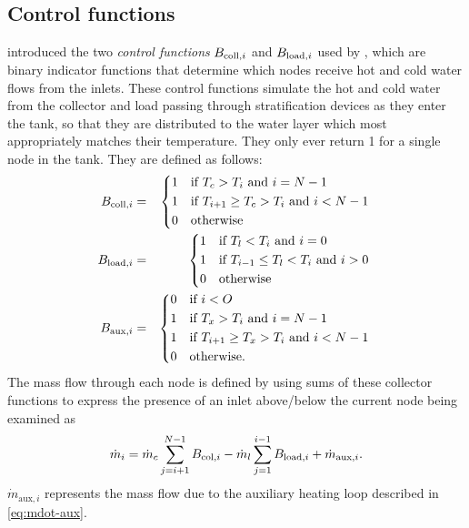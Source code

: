 \subsection{Control functions}

 introduced the two \emph{control functions} $B_{\text{coll}, i}$ and $B_{\text{load}, i}$ used by , which are binary indicator functions that determine which nodes receive hot and cold water flows from the inlets.
These control functions simulate the hot and cold water from the collector and load passing through stratification devices as they enter the tank, so that they are distributed to the water layer which most appropriately matches their temperature.
They only ever return 1 for a single node in the tank.
They are defined as follows:
\begin{eqnarray}
   \label{eq:B-coll}
   \B{coll} &=& \begin{dcases*}
      1 & if $T_c > T_i$ and $i = N-1$ \\
      1 & if $T_{i+1} \ge T_c > T_i$ and $i < N-1$ \\
      0 & otherwise
   \end{dcases*}
   \\
   \label{eq:B-load}
   \B{load} &=& \begin{dcases*}
      1 & if $T_l < T_i$ and $i = 0$ \\
      1 & if $T_{i-1} \le T_l < T_i$ and $i > 0$ \\
      0 & otherwise
   \end{dcases*}
   \\
   \label{eq:B-aux}
   \B{aux} &=& \begin{dcases*}
      0 & if $i < O$ \\
      1 & if $T_x > T_i$ and $i = N-1$ \\
      1 & if $T_{i+1} \ge T_x > T_i$ and $i < N-1$ \\
      0 & otherwise.
   \end{dcases*}
\end{eqnarray}
The mass flow through each node is defined by  using sums of these collector functions to express the presence of an inlet above/below the current node being examined as
\begin{equation}
   \label{eq:mdot}
   \dot{m}_i = \dot{m}_c \sum_{j=i+1}^{N-1} B_{\text{col}, i}
             - \dot{m}_l \sum_{j=1}^{i-1} B_{\text{load}, i}
             + \dot{m}_{\text{aux}, i}.
\end{equation}
$\dot{m}_{\text{aux}, i}$ represents the mass flow due to the auxiliary heating loop described in \autoref{eq:mdot-aux}.
